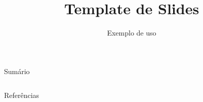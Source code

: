 \documentclass[abnt]{slides}
\title{Template de Slides}
\subtitle{Exemplo de uso}
\begin{document}
\maketitle{}

\begin{slide}{Sumário}
  \begin{columns}[T] %
    \begin{column}{0.48\textwidth} %
      \tableofcontents[sections={1-2}] %
    \end{column}%
    \hfill%
    \begin{column}{0.48\textwidth}
      \tableofcontents[sections={3-}] %
    \end{column}%
  \end{columns}
\end{slide}





\begin{frame}[allowframebreaks]{Referências}
  \nocite{*}
  \printbibliography{}
\end{frame}
\end{document}
